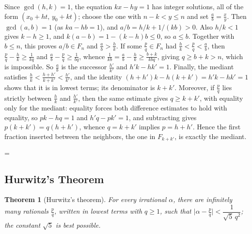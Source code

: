 \documentclass[11pt]{article}
\makeatletter
\theoremstyle{ntstyle}
\newtheorem{theorem}{Theorem}[subsection]
\let\nt@closedisplay\]
\def\nt@guardedclose{\@ifnextchar\par{\nt@closeafterpar}{\@ifnextchar\end{\postdisplaypenalty\@M\nt@closedisplay}{\nt@closedisplay}}}
\def\nt@closeafterpar\par{\@ifnextchar\par{\nt@closeafterpar}{\@ifnextchar\end{\postdisplaypenalty\@M\nt@closedisplay\par}{\nt@closedisplay\par}}}
\renewenvironment{proof}[1][\proofname]{\par
  \pushQED{\qed}\normalfont\topsep\medskipamount\edef\nt@afterproof{\@endparpenalty=\the\@endparpenalty\relax}\@beginparpenalty\@M\@endparpenalty\@M\let\]\nt@guardedclose\trivlist\item[]\textit{#1\@addpunct{.}} \ignorespaces}{\ifvmode\addpenalty\@M\fi\popQED\nt@afterproof\endtrivlist\@endpefalse}
\makeatother
\begin{document}
\begin{proof} Since $\gcd(h, k)=1$, the equation $kx-hy=1$
	has integer solutions, all of the form $(x_0+ht,\,y_0+kt)$; choose
	the one with $n-k<y\le n$ and set $\tfrac{a}{b}=\tfrac{x}{y}$. Then
	$\gcd(a, b)=1$ (as $ka-hb=1$), and $a/b=h/k+1/(kb)>0$. Also $h/k<1$ gives $k-h\ge1$, and $k(a-b)=1-(k-h)b\le0$, so $a\le b$. Together with $b\le n$, this proves $a/b\in F_n$ and $\tfrac{a}{b}>\tfrac{h}{k}$. If some $\tfrac{p}{q}\in F_n$ had
	$\tfrac{h}{k}<\tfrac{p}{q}<\tfrac{a}{b}$, then $\tfrac{p}{q}-\tfrac{h}{k}\ge\tfrac{1}{kq}$ and $\tfrac{a}{b}-\tfrac{p}{q}\ge\tfrac{1}{bq}$, whence
	$\tfrac{1}{kb}=\tfrac{a}{b}-\tfrac{h}{k}\ge\tfrac{b+k}{kbq}$, giving $q\ge
		b+k>n$, which is impossible. So $\tfrac{a}{b}$ is the successor
	$\tfrac{h'}{k'}$ and $h'k-hk'=1$. Finally, the mediant satisfies
	$\tfrac{h}{k}<\tfrac{h+h'}{k+k'}<\tfrac{h'}{k'}$, and the identity
	$(h+h')k-h(k+k')=h'k-hk'=1$ shows that it is in lowest terms; its
	denominator is $k+k'$. Moreover, if $\tfrac{p}{q}$ lies strictly between
	$\tfrac{h}{k}$ and $\tfrac{h'}{k'}$, then the same estimate gives
	$q\ge k+k'$, with equality only for the mediant: equality forces both
	difference estimates to hold with equality, so $pk-hq=1$ and $h'q-pk'=1$, and
	subtracting gives $p(k+k')=q(h+h')$, whence $q=k+k'$ implies $p=h+h'$.
	Hence the first
	fraction inserted between the neighbors, the one in $F_{k+k'}$, is
	exactly the mediant.

\end{proof}
\subsection{Hurwitz's Theorem}

\begin{theorem}[Hurwitz's theorem]\label{thm:10.5.1} For every irrational
	$\alpha$, there are infinitely many rationals $\tfrac{p}{q}$, written in
	lowest terms with $q\ge1$, such that
	$\big|\alpha-\tfrac{p}{q}\big|<\dfrac{1}{\sqrt{5}\,q^2}$; the constant
	$\sqrt{5}$ is best possible.

\end{theorem}
\end{document}
